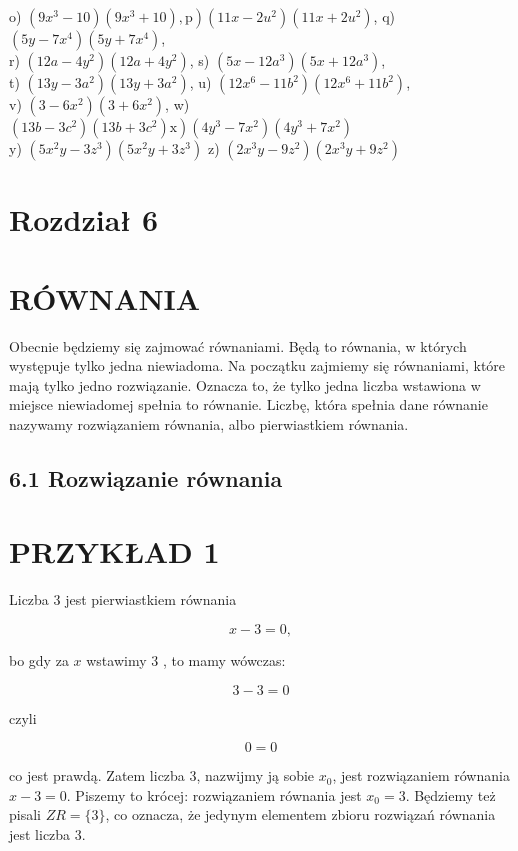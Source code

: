 \documentclass[10pt]{article}
\begin{document}
\begin{enumerate}
o) \(\left.\left(9 x^{3}-10\right)\left(9 x^{3}+10\right), \mathrm{p}\right)\left(11 x-2 u^{2}\right)\left(11 x+2 u^{2}\right)\), q) \(\left(5 y-7 x^{4}\right)\left(5 y+7 x^{4}\right)\),\\
r) \(\left(12 a-4 y^{2}\right)\left(12 a+4 y^{2}\right)\), s) \(\left(5 x-12 a^{3}\right)\left(5 x+12 a^{3}\right)\),\\
t) \(\left(13 y-3 a^{2}\right)\left(13 y+3 a^{2}\right)\), u) \(\left(12 x^{6}-11 b^{2}\right)\left(12 x^{6}+11 b^{2}\right)\),\\
v) \(\left(3-6 x^{2}\right)\left(3+6 x^{2}\right)\), w) \(\left.\left(13 b-3 c^{2}\right)\left(13 b+3 c^{2}\right) \mathrm{x}\right)\left(4 y^{3}-7 x^{2}\right)\left(4 y^{3}+7 x^{2}\right)\)\\
y) \(\left(5 x^{2} y-3 z^{3}\right)\left(5 x^{2} y+3 z^{3}\right)\) z) \(\left(2 x^{3} y-9 z^{2}\right)\left(2 x^{3} y+9 z^{2}\right)\)
\end{enumerate}

\section*{Rozdział 6}
\section*{RÓWNANIA}
Obecnie będziemy się zajmować równaniami. Będą to równania, w których występuje tylko jedna niewiadoma. Na początku zajmiemy się równaniami, które mają tylko jedno rozwiązanie. Oznacza to, że tylko jedna liczba wstawiona w miejsce niewiadomej spełnia to równanie. Liczbę, która spełnia dane równanie nazywamy rozwiązaniem równania, albo pierwiastkiem równania.

\subsection*{6.1 Rozwiązanie równania}
\section*{PRZYKŁAD 1}
Liczba 3 jest pierwiastkiem równania

\[
x-3=0,
\]

bo gdy za \(x\) wstawimy 3 , to mamy wówczas:

\[
3-3=0
\]

czyli

\[
0=0
\]

co jest prawdą. Zatem liczba 3, nazwijmy ją sobie \(x_{0}\), jest rozwiązaniem równania \(x-3=0\). Piszemy to krócej: rozwiązaniem równania jest \(x_{0}=3\). Będziemy też pisali \(Z R=\{3\}\), co oznacza, że jedynym elementem zbioru rozwiązań równania jest liczba 3.
\end{document}
